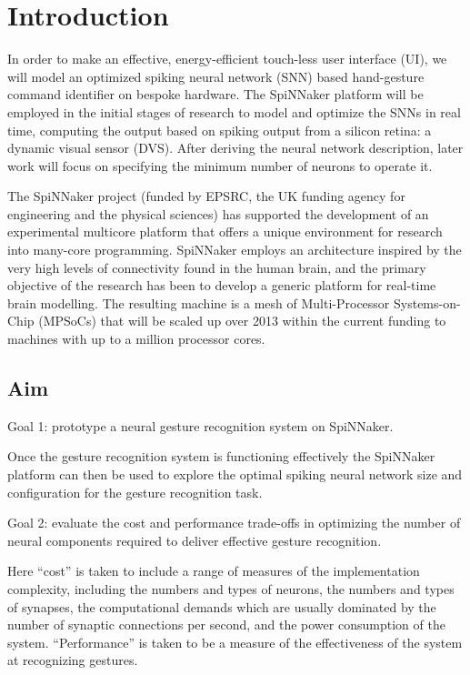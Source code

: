 \chapter{Introduction}
\label{cha:intro}
In order to make an effective, energy-efficient touch-less user interface (UI), we will model an optimized spiking neural network (SNN) based hand-gesture command identifier on bespoke hardware. 
The SpiNNaker platform will be employed in the initial stages of research to model and optimize the SNNs in real time, computing the output based on spiking output from a silicon retina: a dynamic visual sensor (DVS). After deriving the neural network description, later work will focus on specifying the minimum number of neurons to operate it.

The SpiNNaker project (funded by EPSRC, the UK funding agency for engineering and the physical sciences) has supported the development of an experimental multicore platform that offers a unique environment for research into many-core programming. 
SpiNNaker employs an architecture inspired by the very high levels of connectivity found in the human brain, and the primary objective of the research has been to develop a generic platform for real-time brain modelling. The resulting machine is a mesh of Multi-Processor Systems-on-Chip (MPSoCs) that will be scaled up over 2013 within the current funding to machines with up to a million processor cores.

\section{Aim}
\label{sec:aim}
Goal 1:  prototype a neural gesture recognition system on SpiNNaker.

Once the gesture recognition system is functioning effectively the SpiNNaker platform can then be used to explore the optimal spiking neural network size and configuration for the gesture recognition task.

Goal 2:  evaluate the cost and performance trade-offs in optimizing the number of neural components required to deliver effective gesture recognition.

Here “cost” is taken to include a range of measures of the implementation complexity, including the numbers and types of neurons, the numbers and types of synapses, the computational demands which are usually dominated by the number of synaptic connections per second, and the power consumption of the system. “Performance” is taken to be a measure of the effectiveness of the system at recognizing gestures.

